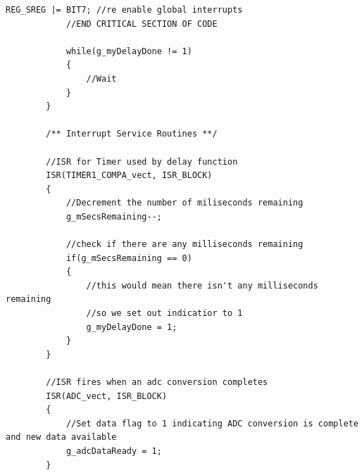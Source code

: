 \documentclass[11pt,pdftex,portrait,letterpaper]{article}
\begin{document}
\begin{lstlisting}[caption={Program 2}, label=l:programx]
			REG_SREG |= BIT7; //re enable global interrupts
			//END CRITICAL SECTION OF CODE
			
			while(g_myDelayDone != 1)
			{
				//Wait
			} 
		}
		
		/** Interrupt Service Routines **/
		
		//ISR for Timer used by delay function
		ISR(TIMER1_COMPA_vect, ISR_BLOCK)
		{
			//Decrement the number of miliseconds remaining
			g_mSecsRemaining--;
			
			//check if there are any milliseconds remaining
			if(g_mSecsRemaining == 0)
			{
				//this would mean there isn't any milliseconds remaining
				//so we set out indicatior to 1
				g_myDelayDone = 1;
			}
		}
		
		//ISR fires when an adc conversion completes
		ISR(ADC_vect, ISR_BLOCK)
		{
			//Set data flag to 1 indicating ADC conversion is complete and new data available
			g_adcDataReady = 1;
		}
	
		
	\end{lstlisting}
	
	
	
	
\end{document}
